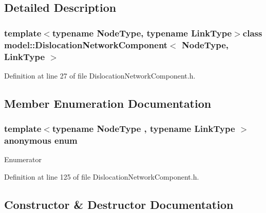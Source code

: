 \subsection{Detailed Description}
\subsubsection*{template$<$typename Node\+Type, typename Link\+Type$>$class model\+::\+Dislocation\+Network\+Component$<$ Node\+Type, Link\+Type $>$}



Definition at line 27 of file Dislocation\+Network\+Component.\+h.



\subsection{Member Enumeration Documentation}
\hypertarget{classmodel_1_1_dislocation_network_component_ae887ec550c152d1b4ec9b04679b73435}{}\subsubsection[{anonymous enum}]{\setlength{\rightskip}{0pt plus 5cm}template$<$typename Node\+Type , typename Link\+Type $>$ anonymous enum}\label{classmodel_1_1_dislocation_network_component_ae887ec550c152d1b4ec9b04679b73435}
\begin{Desc}
\item[Enumerator]\par
\begin{description}
\item[{\em 
\hypertarget{classmodel_1_1_dislocation_network_component_ae887ec550c152d1b4ec9b04679b73435a8cb6343a8da1d071229f68db375665a3}{}Ndof\+Xnode\label{classmodel_1_1_dislocation_network_component_ae887ec550c152d1b4ec9b04679b73435a8cb6343a8da1d071229f68db375665a3}
}]\end{description}
\end{Desc}


Definition at line 125 of file Dislocation\+Network\+Component.\+h.



\subsection{Constructor \& Destructor Documentation}
\hypertarget{classmodel_1_1_dislocation_network_component_a74ce7162192bfd30a20dd1d3e1e0054c}{}

